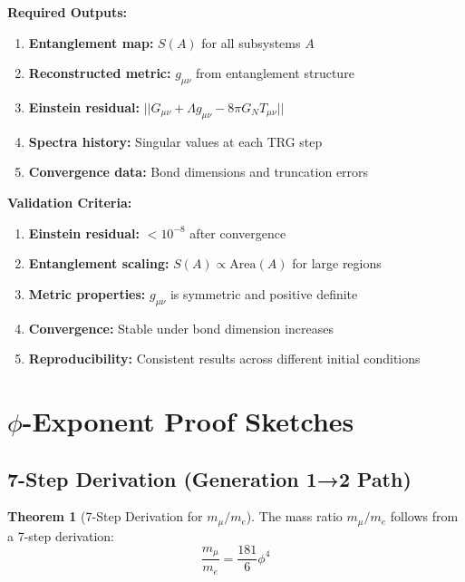\documentclass[11pt]{article}
\theoremstyle{definition}
\newtheorem{theorem}{Theorem}[section]
\newcommand{\goldenratio}{\phi}
\begin{document}
\textbf{Required Outputs:}
\begin{enumerate}
\item \textbf{Entanglement map:} $S(A)$ for all subsystems $A$
\item \textbf{Reconstructed metric:} $g_{\mu\nu}$ from entanglement structure
\item \textbf{Einstein residual:} $||G_{\mu\nu} + \Lambda g_{\mu\nu} - 8\pi G_N T_{\mu\nu}||$
\item \textbf{Spectra history:} Singular values at each TRG step
\item \textbf{Convergence data:} Bond dimensions and truncation errors
\end{enumerate}

\textbf{Validation Criteria:}
\begin{enumerate}
\item \textbf{Einstein residual:} $< 10^{-8}$ after convergence
\item \textbf{Entanglement scaling:} $S(A) \propto \text{Area}(A)$ for large regions
\item \textbf{Metric properties:} $g_{\mu\nu}$ is symmetric and positive definite
\item \textbf{Convergence:} Stable under bond dimension increases
\item \textbf{Reproducibility:} Consistent results across different initial conditions
\end{enumerate}

\section{$\goldenratio$-Exponent Proof Sketches}

\subsection{7-Step Derivation (Generation 1→2 Path)}

\begin{theorem}[7-Step Derivation for $m_\mu/m_e$]
The mass ratio $m_\mu/m_e$ follows from a 7-step derivation:
\begin{equation}
\frac{m_\mu}{m_e} = \frac{181}{6}\goldenratio^4
\end{equation}
\end{theorem}
\end{document}
